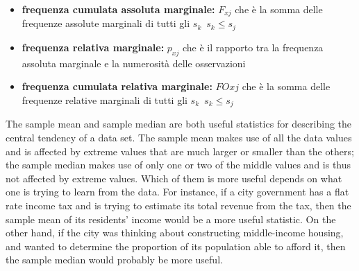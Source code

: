 \documentclass[a4paper,12pt, oneside]{book}
\begin{document}
\begin{itemize}
\item \textbf{frequenza cumulata assoluta marginale:} $F_{xj}$ che è la somma delle frequenze assolute marginali di tutti gli $s_k\,\,\,s_k\leq s_j$ 
\item \textbf{frequenza relativa marginale:} $p_{xj}$ che è il rapporto tra la frequenza assoluta marginale e la numerosità delle osservazioni
\item \textbf{frequenza cumulata relativa marginale:} $FO{xj}$ che è la somma delle frequenze relative marginali di tutti gli $s_k\,\,\,s_k\leq s_j$  
\end{itemize}
The sample mean and sample median are both useful statistics for describing the
central tendency of a data set. The sample mean makes use of all the data values and
is affected by extreme values that are much larger or smaller than the others; the sample
median makes use of only one or two of the middle values and is thus not affected by
extreme values. Which of them is more useful depends on what one is trying to learn
from the data. For instance, if a city government has a flat rate income tax and is trying to
estimate its total revenue from the tax, then the sample mean of its residents’ income would
be a more useful statistic. On the other hand, if the city was thinking about constructing
middle-income housing, and wanted to determine the proportion of its population able
to afford it, then the sample median would probably be more useful.
\end{document}
